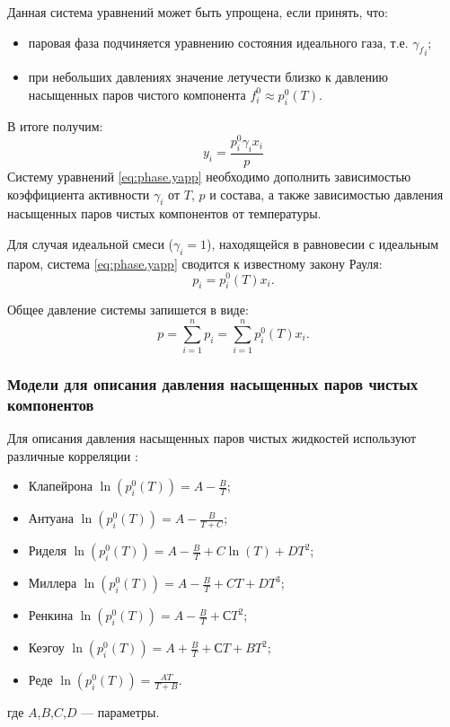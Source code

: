 Данная система уравнений может быть упрощена, если принять, что:
\begin{itemize}
	\item паровая фаза подчиняется  уравнению состояния идеального газа, т.е. ${\gamma_f}_i$;
	\item при небольших давлениях значение летучести близко к давлению насыщенных паров чистого компонента $f_i^0 \approx p^0_i (T)$.
\end{itemize}
В итоге получим:
\begin{equation} \label{eq:phase.yapp}
y_i=\dfrac{p_i^0 \gamma_i x_i}{ p}
\end{equation}
Систему уравнений \eqref{eq:phase.yapp} необходимо дополнить зависимостью коэффициента активности $\gamma_i$ от $T$, $p$ и состава, а также зависимостью давления насыщенных паров чистых компонентов от температуры. 

Для случая идеальной смеси ($\gamma_i=1$), находящейся в равновесии с идеальным паром, система \eqref{eq:phase.yapp} сводится к известному закону Рауля:
\begin{equation}
	p_i=p_i^0(T) x_i.
\end{equation}

Общее давление системы запишется в виде:
\begin{equation}\label{eq.phase.sump}
	p=\sum\limits_{i=1}^{n} p_i=  \sum\limits_{i=1}^{n} p_i^0 (T) x_i.
\end{equation}

\subsubsection{Модели для описания давления насыщенных паров чистых компонентов}


Для описания давления насыщенных паров чистых жидкостей используют различные корреляции \cite{yelles1989,rid1982}:
\begin{itemize}
	\item Клапейрона $\ln(p_i^0(T))=A-\frac{B}{T}$;
	\item Антуана $\ln(p_i^0(T))=A-\frac{B}{T+C}$;
	\item Риделя $\ln(p_i^0(T))=A-\frac{B}{T}+C \ln(T)+D T^2$;
	\item Миллера $\ln(p_i^0(T))=A-\frac{B}{T}+C T+D T^3$;
	\item Ренкина $\ln(p_i^0(T))=A-\frac{B}{T}+С T^2$;
	\item Кеэгоу $\ln(p_i^0(T))=A+\frac{B}{T}+С T+BT^2$;
	\item Реде $\ln(p_i^0(T))=\frac{AT}{T+B}$.
\end{itemize}
где $A$,$B$,$C$,$D$ --- параметры.

